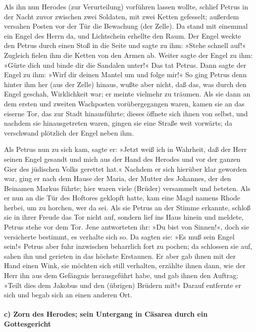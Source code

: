  Als ihn nun Herodes (zur Verurteilung) vorführen lassen
wollte, schlief Petrus in der Nacht zuvor zwischen zwei Soldaten, mit
zwei Ketten gefesselt; außerdem versahen Posten vor der Tür die
Bewachung (der Zelle).  Da stand mit einemmal ein Engel
des Herrn da, und Lichtschein erhellte den Raum. Der Engel weckte den
Petrus durch einen Stoß in die Seite und sagte zu ihm: »Stehe schnell
auf!« Zugleich fielen ihm die Ketten von den Armen ab. 
Weiter sagte der Engel zu ihm: »Gürte dich und binde dir die Sandalen
unter!« Das tat Petrus. Dann sagte der Engel zu ihm: »Wirf dir deinen
Mantel um und folge mir!«  So ging Petrus denn hinter ihm
her (aus der Zelle) hinaus, wußte aber nicht, daß das, was durch den
Engel geschah, Wirklichkeit war; er meinte vielmehr zu träumen.
 Als sie dann an dem ersten und zweiten Wachposten
vorübergegangen waren, kamen sie an das eiserne Tor, das zur Stadt
hinausführte; dieses öffnete sich ihnen von selbst, und nachdem sie
hinausgetreten waren, gingen sie eine Straße weit vorwärts; da
verschwand plötzlich der Engel neben ihm.

 Als Petrus nun zu sich kam, sagte er: »Jetzt weiß ich in
Wahrheit, daß der Herr seinen Engel gesandt und mich aus der Hand des
Herodes und vor der ganzen Gier des jüdischen Volks gerettet hat.«
 Nachdem er sich hierüber klar geworden war, ging er nach
dem Hause der Maria, der Mutter des Johannes, der den Beinamen Markus
führte; hier waren viele (Brüder) versammelt und beteten.
 Als er nun an die Tür des Hoftores geklopft hatte, kam
eine Magd namens Rhode herbei, um zu horchen, wer da sei.
 Als sie Petrus an der Stimme erkannte, schloß sie in
ihrer Freude das Tor nicht auf, sondern lief ins Haus hinein und
meldete, Petrus stehe vor dem Tor.  Jene antworteten ihr:
»Du bist von Sinnen!«, doch sie versicherte bestimmt, es verhalte sich
so.  Da sagten sie: »Es muß sein Engel sein!« Petrus aber
fuhr inzwischen beharrlich fort zu pochen; da schlossen sie auf, sahen
ihn und gerieten in das höchste Erstaunen.  Er aber gab
ihnen mit der Hand einen Wink, sie möchten sich still verhalten,
erzählte ihnen dann, wie der Herr ihn aus dem Gefängnis herausgeführt
habe, und gab ihnen den Auftrag: »Teilt dies dem Jakobus und den
(übrigen) Brüdern mit!« Darauf entfernte er sich und begab sich an einen
anderen Ort.

\hypertarget{c-zorn-des-herodes-sein-untergang-in-cuxe4sarea-durch-ein-gottesgericht}{%
\paragraph{c) Zorn des Herodes; sein Untergang in Cäsarea durch ein
Gottesgericht}\label{c-zorn-des-herodes-sein-untergang-in-cuxe4sarea-durch-ein-gottesgericht}}


